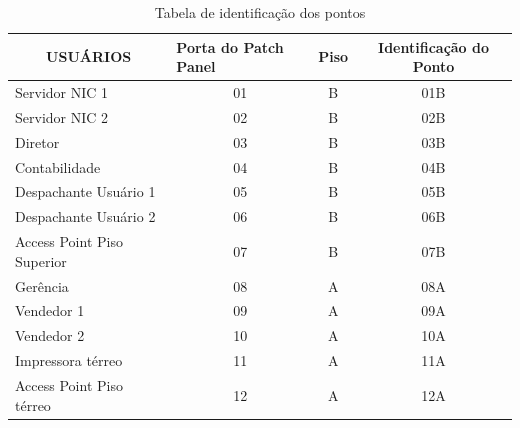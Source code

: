 \documentclass[	DIV=calc,%
							paper=a4,%
							fontsize=12pt,%
							onecolumn]{scrartcl}	 					%
\begin{document}
\begin{table}[H]
	\centering
	\caption{Tabela de identificação dos pontos}
	\label{my-label}
	\begin{tabular}{|l|c|c|c|}
		\hline
		\multicolumn{1}{|c|}{\textbf{USUÁRIOS}} & \multicolumn{1}{l|}{\textbf{Porta do Patch Panel}} & \multicolumn{1}{l|}{\textbf{Piso}} & \textbf{Identificação do Ponto} \\ \hline
		Servidor NIC 1                          & 01                                                 & B                                  & 01B                             \\ \hline
		Servidor NIC 2                          & 02                                                 & B                                  & 02B                             \\ \hline
		Diretor                                 & 03                                                 & B                                  & 03B                             \\ \hline
		Contabilidade                           & 04                                                 & B                                  & 04B                             \\ \hline
		Despachante Usuário 1                   & 05                                                 & B                                  & 05B                             \\ \hline
		Despachante Usuário 2                   & 06                                                 & B                                  & 06B                             \\ \hline
		Access Point Piso Superior              & 07                                                 & B                                  & 07B                             \\ \hline
		Gerência                                & 08                                                 & A                                  & 08A                             \\ \hline
		Vendedor 1                              & 09                                                 & A                                  & 09A                             \\ \hline
		Vendedor 2                              & 10                                                 & A                                  & 10A                             \\ \hline
		Impressora térreo                       & 11                                                 & A                                  & 11A                             \\ \hline
		Access Point Piso térreo                & 12                                                 & A                                  & 12A                             \\ \hline
	\end{tabular}
\end{table}
\end{document}
